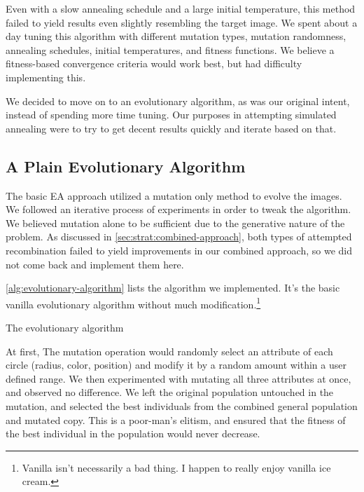 \documentclass{article}
\begin{document}
Even with a slow annealing schedule and a large initial temperature, this method failed to yield results even slightly resembling the target image. We spent about a day tuning this algorithm with different mutation types, mutation randomness, annealing schedules, initial temperatures, and fitness functions. We believe a fitness-based convergence criteria would work best, but had difficulty implementing this.

We decided to move on to an evolutionary algorithm, as was our original intent, instead of spending more time tuning. Our purposes in attempting simulated annealing were to try to get decent results quickly and iterate based on that.

\subsection{A Plain Evolutionary Algorithm}\label{sec:strat:evolutionary-algorithm}
The basic EA approach utilized a mutation only method to evolve the images. We followed an iterative process of experiments in order to tweak the algorithm. We believed mutation alone to be sufficient due to the generative nature of the problem. As discussed in \autoref{sec:strat:combined-approach}, both types of attempted recombination failed to yield improvements in our combined approach, so we did not come back and implement them here.

\autoref{alg:evolutionary-algorithm} lists the algorithm we implemented. It's the basic vanilla evolutionary algorithm without much modification.\footnote{Vanilla isn't necessarily a bad thing. I happen to really enjoy vanilla ice cream.}

\begin{algorithm}[h]
    \begin{algorithmic}
            \IComment{\dots}
            \EndWhile{}
        \EndFunction{}
    \end{algorithmic}
    \caption{The evolutionary algorithm}\label{alg:evolutionary-algorithm}
\end{algorithm}

At first, The mutation operation would randomly select an attribute of each circle (radius, color, position) and modify it by a random amount within a user defined range. We then experimented with mutating all three attributes at once, and observed no difference. We left the original population untouched in the mutation, and selected the best individuals from the combined general population and mutated copy. This is a poor-man's elitism, and ensured that the fitness of the best individual in the population would never decrease.
\end{document}
